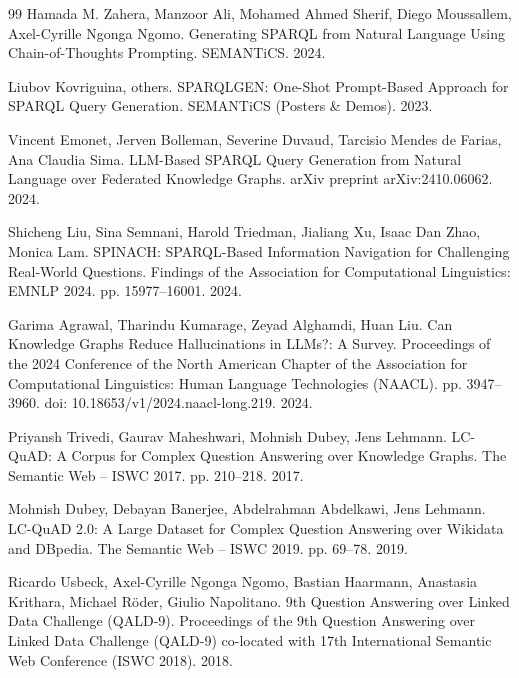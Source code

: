 \documentclass[
  12pt,
  english,
  oneside]{report}
\begin{document}
\begin{thebibliography}{99}
Hamada M. Zahera, Manzoor Ali, Mohamed Ahmed Sherif, Diego Moussallem, Axel-Cyrille Ngonga Ngomo. Generating {SPARQL} from Natural Language Using Chain-of-Thoughts Prompting. SEMANTiCS. 2024.

Liubov Kovriguina, others. {SPARQLGEN}: One-Shot Prompt-Based Approach for {SPARQL} Query Generation. SEMANTiCS (Posters \& Demos). 2023.

Vincent Emonet, Jerven Bolleman, Severine Duvaud, Tarcisio Mendes de Farias, Ana Claudia Sima. {LLM}-Based {SPARQL} Query Generation from Natural Language over Federated Knowledge Graphs. arXiv preprint arXiv:2410.06062. 2024.

Shicheng Liu, Sina Semnani, Harold Triedman, Jialiang Xu, Isaac Dan Zhao, Monica Lam. {SPINACH}: {SPARQL}-Based Information Navigation for Challenging Real-World Questions. Findings of the Association for Computational Linguistics: EMNLP 2024. pp. 15977--16001. 2024.

Garima Agrawal, Tharindu Kumarage, Zeyad Alghamdi, Huan Liu. Can Knowledge Graphs Reduce Hallucinations in {LLMs}?: A Survey. Proceedings of the 2024 Conference of the North American Chapter of the Association for Computational Linguistics: Human Language Technologies (NAACL). pp. 3947--3960. doi: 10.18653/v1/2024.naacl-long.219. 2024.

Priyansh Trivedi, Gaurav Maheshwari, Mohnish Dubey, Jens Lehmann. {LC-QuAD}: A Corpus for Complex Question Answering over Knowledge Graphs. The Semantic Web -- ISWC 2017. pp. 210--218. 2017.

Mohnish Dubey, Debayan Banerjee, Abdelrahman Abdelkawi, Jens Lehmann. {LC-QuAD} 2.0: A Large Dataset for Complex Question Answering over {Wikidata} and {DBpedia}. The Semantic Web -- ISWC 2019. pp. 69--78. 2019.

Ricardo Usbeck, Axel-Cyrille Ngonga Ngomo, Bastian Haarmann, Anastasia Krithara, Michael R{\"o}der, Giulio Napolitano. 9th Question Answering over Linked Data Challenge ({QALD}-9). Proceedings of the 9th Question Answering over Linked Data Challenge (QALD-9) co-located with 17th International Semantic Web Conference (ISWC 2018). 2018.


\end{thebibliography}
\end{document}
